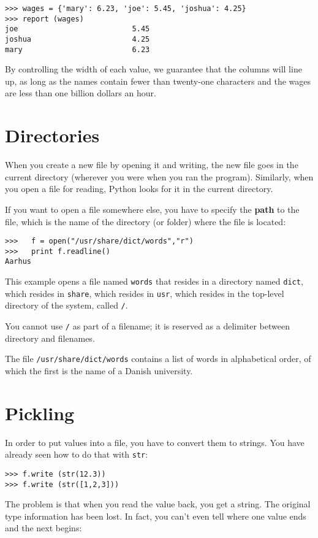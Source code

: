 \beforeverb
\begin{verbatim}
>>> wages = {'mary': 6.23, 'joe': 5.45, 'joshua': 4.25}
>>> report (wages)
joe                          5.45
joshua                       4.25
mary                         6.23
\end{verbatim}
\afterverb
%
By controlling the width of each value, we guarantee that the columns
will line up, as long as the names contain fewer than twenty-one
characters and the wages are less than one billion dollars an hour.


\section{Directories}

When you create a new file by opening it and writing, the new
file goes in the current directory (wherever you were when
you ran the program).  Similarly, when you open a file for
reading, Python looks for it in the current directory.

If you want to open a file somewhere else, you have to specify
the {\bf path} to the file, which is the name of the directory
(or folder) where the file is located:

\beforeverb
\begin{verbatim}
>>>   f = open("/usr/share/dict/words","r")
>>>   print f.readline()
Aarhus
\end{verbatim}
\afterverb
%
This example opens a file named {\tt words} that resides in a
directory named {\tt dict}, which resides in {\tt share}, which
resides in {\tt usr}, which resides in the top-level directory
of the system, called {\tt /}.


You cannot use {\tt /}
as part of a filename; it is reserved as a delimiter between
directory and filenames.

The file {\tt /usr/share/dict/words} contains a list of words
in alphabetical order, of which the first is the name of a
Danish university.


\section{Pickling}

In order to put values into a file, you have to convert them
to strings.  You have already seen how to do that with {\tt str}:

\beforeverb
\begin{verbatim}
>>> f.write (str(12.3))
>>> f.write (str([1,2,3]))
\end{verbatim}
\afterverb
%
The problem is that when you read the value back, you get a string.
The original type information has been lost.  In fact, you can't
even tell where one value ends and the next begins:

